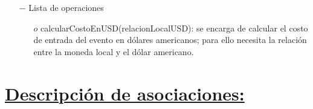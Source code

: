 \documentclass[a4paper]{article}
\begin{document}
\begin{itemize}
{\begin{itemize}
\begin{itemize}
        \end{itemize}
      
      \item[$-$] Lista de operaciones
   
   
      \begin{itemize}
      \item[$o$] calcularCostoEnUSD(relacionLocalUSD): se encarga de calcular el costo de entrada del evento en dólares americanos; para ello necesita la relación entre la moneda local y el dólar americano.
   \end{itemize}


    \end{itemize}

}

\end{itemize}


\section{\underline{Descripción de asociaciones:} }
\end{document}
